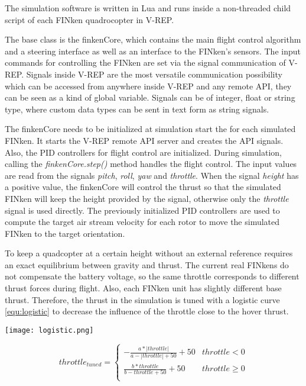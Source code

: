 The simulation software is written in Lua and runs inside a non-threaded child script of each FINken quadrocopter in V-REP.  

The base class is the finkenCore, which contains the main flight control algorithm and a steering interface as well as an interface to the FINken's sensors.
The input commands for controlling the FINken are set via the signal communication of V-REP. Signals inside V-REP are the most versatile communication possibility which can be accessed from anywhere inside V-REP and any remote API, they can be seen as a kind of global variable. Signals can be of integer, float or string type, where custom data types can be sent in text form as string signals. 

The finkenCore needs to be initialized at simulation start the for each simulated FINken. It starts the V-REP remote API server and creates the API signals. Also, the \gls{PID} controllers for flight control are initialized. 
During simulation, calling the \textit{finkenCore.step()} method handles the flight control. The input values are read from the signals \textit{pitch}, \textit{roll}, \textit{yaw} and \textit{throttle}. When the signal \textit{height} has a positive value, the finkenCore will control the thrust so that the simulated FINken will keep the height provided by the signal, otherwise only the \textit{throttle} signal is used directly. The previously initialized \gls{PID} controllers are used to compute the target air stream velocity for each rotor to move the simulated FINken to the target orientation.

To keep a quadcopter at a certain height without an external reference requires an exact equilibrium between gravity and thrust. The current real FINkens do not compensate the battery voltage, so the same throttle corresponds to different thrust forces during flight. Also, each FINken unit has slightly different base thrust. Therefore, the thrust in the simulation is tuned with a logistic curve \ref{equ:logistic} to decrease the influence of the throttle close to the hover thrust. 

\begin{minipage}{0.4\textwidth}


		\texttt{[image: logistic.png]}
	\label{fig:throttleTuning}

\end{minipage}%
\begin{minipage}{0.6\textwidth}
\begin{equation}
	throttle_{tuned} = \begin{cases}
		-\frac{a * |throttle|}{a - |throttle| + 50} + 50 & throttle < 0 \\
		\frac{b * throttle}{b - throttle + 50} + 50 & throttle \geq 0\\
	\end{cases}
\label{equ:logistic}
\end{equation}
\end{minipage}

